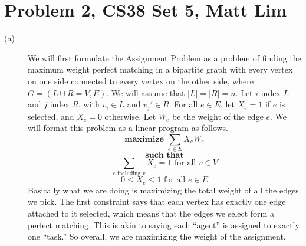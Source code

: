 \documentclass{article}
\begin{document}
\newpage

\section*{Problem 2, CS38 Set 5, Matt Lim}
\begin{description}
    \item[(a)]
        We will first formulate the Assignment Problem as a problem of finding
        the maximum weight perfect matching in a bipartite graph with every
        vertex on one side connected to every vertex on the other side, where
        $G = (L \cup R = V, E)$. We will assume that $|L| = |R| = n$.
        Let $i$ index $L$ and $j$ index $R$, with $v_i \in L$ and $v_j' \in R$.
        For all $e \in E$, let $X_e = 1$ if $e$ is selected, and $X_e = 0$
        otherwise. Let $W_e$ be the weight of the edge $e$.
        We will format this problem as a linear program as follows.
        \[ \textbf{maximize } \sum_{e \in E} X_e W_e \]
        \[ \textbf{such that} \]
        \[ \sum_{e \text{ including $v$}} X_e = 1 \text{ for all $v \in V$} \]
        \[ 0 \le X_e \le 1 \text{ for all $e \in E$} \]
        Basically what we are doing is maximizing the total weight of all the
        edges we pick. The first constraint says that each vertex has exactly one
        edge attached to it selected, which means that the edges we select form a perfect
        matching. This is akin to saying each ``agent'' is assigned to exactly one ``task.''
        So overall, we are maximizing the weight of the assignment.

        \vspace{5mm}


\end{description}
\end{document}
